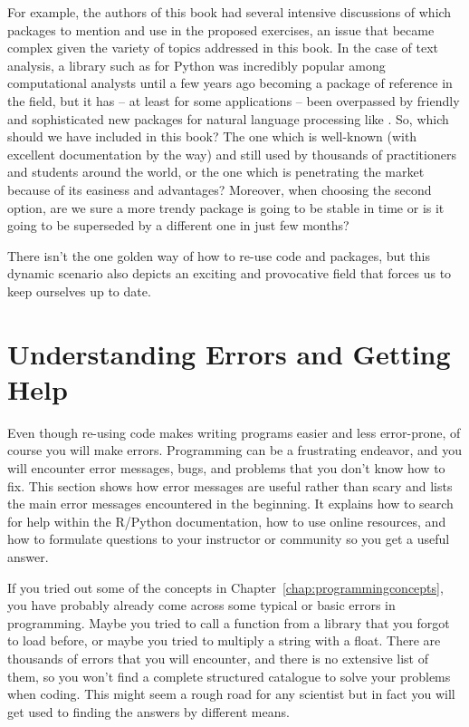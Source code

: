 For example, the authors of this book had several intensive discussions of which packages to mention and use in the proposed exercises, an issue that became complex given the variety of topics addressed in this book. In the case of text analysis, a library such as  for Python was incredibly popular among computational analysts until a few years ago becoming a package of reference in the field, but it has -- at least for some applications -- been overpassed by friendly and sophisticated new packages for natural language processing like . So, which should we have included in this book? The one which is well-known (with excellent documentation by the way) and still used by thousands of practitioners and students around the world, or the one which is penetrating the market because of its easiness and advantages? Moreover, when choosing the second option, are we sure a more trendy package is going to be stable in time or is it going to be superseded by a different one in just few months?

There isn't the one golden way of how to re-use code and packages, but this dynamic scenario also depicts an exciting and provocative field that forces us to keep ourselves up to date.


%

\section{Understanding Errors and Getting Help}
\label{sec:errors}

Even though re-using code makes writing programs easier and less error-prone, of course you will make errors.
Programming can be a frustrating endeavor, and you will encounter error messages, bugs, and problems that you don’t know how to fix. This section shows how error messages are useful rather than scary and lists the main error messages encountered in the beginning. It explains how to search for help within the R/Python documentation, how to use online resources, and how to formulate questions to your instructor or community so you get a useful answer.

If you tried out some of the concepts in Chapter~\ref{chap:programmingconcepts}, you have probably already come across some typical or basic errors in programming. Maybe you tried to call a function from a library that you forgot to load before, or maybe you tried to multiply a string with a float.
There are thousands of  errors that you will encounter, and there is no extensive list of them, so you won't find a complete structured catalogue to solve your problems when coding. This might seem a rough road for any scientist but in fact you will get used to finding the answers by different means.

